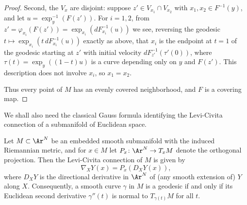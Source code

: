 \begin{proof}
Second, the $V_x$ are disjoint: suppose $z'\in V_{x_1}\cap V_{x_2}$
with $x_1,x_2\in F^{-1}(y)$, and let $u=\exp_y^{-1}(F(z'))$. For
$i=1,2$, from $z'=\varphi_{x_i}(F(z'))
=\exp_{x_i}(dF_{x_i}^{-1}(u))$ we see, reversing the geodesic
$t\mapsto \exp_{x_i}\left(t\,dF_{x_i}^{-1}(u)\right)$ exactly as
above, that $x_i$ is the endpoint at $t=1$ of the geodesic starting
at $z'$ with initial velocity $dF_{z'}^{-1}(\tau'(0))$, where
$\tau(t)=\exp_y((1-t)u)$ is a curve depending only on $y$ and
$F(z')$. This description does not involve $x_i$, so $x_1=x_2$.

Thus every point of $M$ has an evenly covered neighborhood, and $F$
is a covering map.
\end{proof}

We shall also need the classical Gauss formula identifying the
Levi-Civita connection of a submanifold of Euclidean space.

\begin{lemma}
\label{lem:submanifold-connection}
Let $M\subset\Ar^N$ be an embedded smooth submanifold with the
induced Riemannian metric, and for $x\in M$ let
$P_x\colon\Ar^N\to T_xM$ denote the orthogonal projection. Then
the Levi-Civita connection of $M$ is given by
$$\nabla_XY(x)=P_x\left(D_XY(x)\right),$$
where $D_XY$ is the directional derivative in $\Ar^N$ of (any
smooth extension of) $Y$ along $X$. Consequently, a smooth curve
$\gamma$ in $M$ is a geodesic if and only if its Euclidean second
derivative $\gamma''(t)$ is normal to $T_{\gamma(t)}M$ for all
$t$.
\end{lemma}

